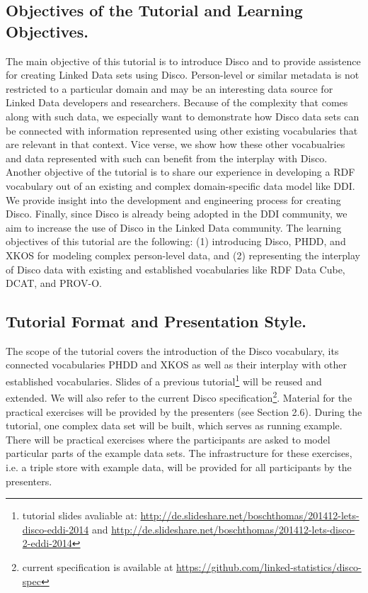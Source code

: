 \documentclass{llncs}
\begin{document}
\subsection{Objectives of the Tutorial and Learning Objectives.} 
The main objective of this tutorial is to introduce Disco and to provide assistence for creating Linked Data sets using Disco. Person-level or similar metadata is not restricted to a particular domain and may be an interesting data source for Linked Data developers and researchers.
Because of the complexity that comes along with such data, we especially want to demonstrate how Disco data sets can be connected with information represented using other existing vocabularies that are relevant in that context. Vice verse, we show how these other vocabualries and data represented with such can benefit from the interplay with Disco.
Another objective of the tutorial is to share our experience in developing a RDF vocabulary out of an existing and complex domain-specific data model like DDI. We provide insight into the development and engineering process for creating Disco.
Finally, since Disco is already being adopted in the DDI community, we aim to increase the use of Disco in the Linked Data community.
The learning objectives of this tutorial are the following: (1) introducing Disco, PHDD, and XKOS for modeling complex person-level data, and (2) representing the interplay of Disco data with existing and established vocabularies like RDF Data Cube, DCAT, and PROV-O.

\subsection{Tutorial Format and Presentation Style.}
The scope of the tutorial covers the introduction of the Disco vocabulary, its connected vocabularies PHDD and XKOS as well as their interplay with other established vocabularies.
Slides of a previous tutorial\footnote{tutorial slides avaliable at: \url{http://de.slideshare.net/boschthomas/201412-lets-disco-eddi-2014} and \url{http://de.slideshare.net/boschthomas/201412-lets-disco-2-eddi-2014}} 
will be reused and extended. We will also refer to the current Disco specification\footnote{current specification is available at \url{https://github.com/linked-statistics/disco-spec}}.
Material for the practical exercises will be provided by the presenters (see Section 2.6).
During the tutorial, one complex data set will be built, which serves as running example. There will be practical exercises where the participants are asked to model particular parts of the example data sets. The infrastructure for these exercises, i.e. a triple store with example data, will be provided for all participants by the presenters.
\end{document}
